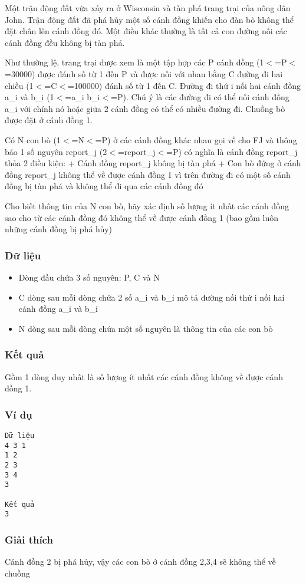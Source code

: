



   Một trận động đất vừa xảy ra ở Wisconsin và tàn phá trang trại của nông dân John. Trận động đất đã phá hủy một số cánh đồng khiến cho đàn bò không thể đặt chân lên cánh đồng đó. Một điều khác thường là tất cả con đường nối các cánh đồng đều không bị tàn phá.  

   Như thường lệ, trang trại được xem là một tập hợp các P cánh đồng (1$<$=P$<$=30000) được đánh số từ 1 đến P và được nối với nhau bằng C đường đi hai chiều (1$<$=C$<$=100000) đánh số từ 1 đến C. Đường đi thứ i nối hai cánh đồng a\_i và b\_i (1$<$=a\_i b\_i$<$=P). Chú ý là các đường đi có thể nối cánh đồng a\_i với chính nó hoặc giữa 2 cánh đồng có thể có nhiều đường đi. Chuồng bò được đặt ở cánh đồng 1.  

   Có N con bò (1$<$=N$<$=P) ở các cánh đồng khác nhau gọi về cho FJ và thông báo 1 số nguyên report\_j (2$<$=report\_j$<$=P) có nghĩa là cánh đồng report\_j thỏa 2 điều kiện: + Cánh đồng report\_j không bị tàn phá + Con bò đứng ở cánh đồng report\_j không thể về được cánh đồng 1 vì trên đường đi có một số cánh đồng bị tàn phá và không thể đi qua các cánh đồng đó  

   Cho biết thông tin của N con bò, hãy xác định số lượng ít nhất các cánh đồng sao cho từ các cánh đồng đó không thể về được cánh đồng 1 (bao gồm luôn những cánh đồng bị phá hủy)  

\subsubsection{   Dữ liệu  }
\begin{itemize}
	\item     Dòng đầu chứa 3 số nguyên: P, C và N   
	\item     C dòng sau mỗi dòng chứa 2 số a\_i và b\_i mô tả đường nối thứ i nối hai cánh đồng a\_i và b\_i   
	\item     N dòng sau mỗi dòng chứa một số nguyên là thông tin của các con bò   
\end{itemize}

\subsubsection{   Kết quả  }

   Gồm 1 dòng duy nhất là số lượng ít nhất các cánh đồng không về được cánh đồng 1.  

\subsubsection{   Ví dụ  }
\begin{verbatim}
Dữ liệu
4 3 1
1 2
2 3
3 4
3

Kết quả
3
\end{verbatim}

\subsubsection{   Giải thích  }

   Cánh đồng 2 bị phá hủy, vậy các con bò ở cánh đồng 2,3,4 sẽ không thể về chuồng  
